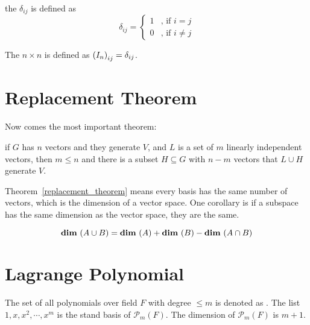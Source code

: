\begin{definition}
	the   $\delta_{ij}$ is defined as 
	\begin{equation}
		\delta_{ij} = \begin{cases}
			1 & \text{, if } i = j \\
			0 & \text{, if } i \neq j
 		\end{cases}
	\end{equation}
\end{definition}

\begin{definition}
	The $n\times n$   is defined as $\mleft(I_n \mright)_{ij} = \delta_{ij}$.
\end{definition}



\section{Replacement Theorem}
Now comes the most important theorem:
\begin{theorem}\label{replacement_theorem}
    if $G$ has $n$ vectors and they generate $V$, and $L$ is a set of $m$ linearly independent vectors, then $m \leq n$ and there is a subset $H \subseteq G$ with $n-m$ vectors that $L \cup H $ generate $V$.
    
\end{theorem}

Theorem~\ref{replacement_theorem} means every basis has the same number of vectors, which is the dimension of a vector space. One corollary is if a subspace has the same dimension as the vector space, they are the same.


\begin{theorem}
    \begin{equation}
        \dimension{A\cup B} = \dimension{A} + \dimension{B} - \dimension{A \cap B}
    \end{equation}    
\end{theorem}


\section{Lagrange Polynomial}

\begin{definition}
    The set of all polynomials over field $F$ with degree $\leq m$ is denoted as . The list $1, x, x^2, \cdots, x^m$ is the stand basis of $\mathcal{P}_m (F)$. The dimension of $\mathcal{P}_m (F)$ is $m+1$.
\end{definition}


